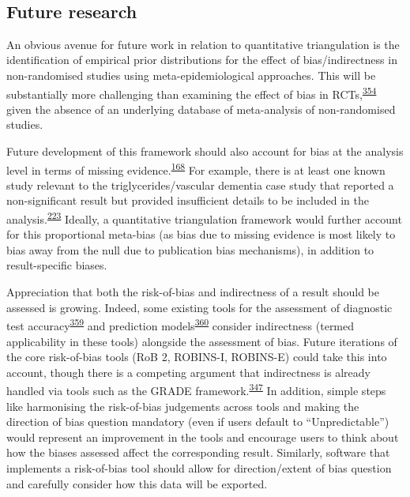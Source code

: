 \documentclass[a4paper, twoside]{templates/ociamthesis}
\begin{document}
~

\hypertarget{future-research}{%
\subsection{Future research}\label{future-research}}

An obvious avenue for future work in relation to quantitative triangulation is the identification of empirical prior distributions for the effect of bias/indirectness in non-randomised studies using meta-epidemiological approaches. This will be substantially more challenging than examining the effect of bias in RCTs,\textsuperscript{\protect\hyperlink{ref-savovic2018}{354}} given the absence of an underlying database of meta-analysis of non-randomised studies.

Future development of this framework should also account for bias at the analysis level in terms of missing evidence.\textsuperscript{\protect\hyperlink{ref-zotero-15123}{168}} For example, there is at least one known study relevant to the triglycerides/vascular dementia case study that reported a non-significant result but provided insufficient details to be included in the analysis.\textsuperscript{\protect\hyperlink{ref-chiang2007}{223}} Ideally, a quantitative triangulation framework would further account for this proportional meta-bias (as bias due to missing evidence is most likely to bias away from the null due to publication bias mechanisms), in addition to result-specific biases.

Appreciation that both the risk-of-bias and indirectness of a result should be assessed is growing. Indeed, some existing tools for the assessment of diagnostic test accuracy\textsuperscript{\protect\hyperlink{ref-whiting2011}{359}} and prediction models\textsuperscript{\protect\hyperlink{ref-moons2019}{360}} consider indirectness (termed applicability in these tools) alongside the assessment of bias. Future iterations of the core risk-of-bias tools (RoB 2, ROBINS-I, ROBINS-E) could take this into account, though there is a competing argument that indirectness is already handled via tools such as the GRADE framework.\textsuperscript{\protect\hyperlink{ref-guyatt2011}{347}} In addition, simple steps like harmonising the risk-of-bias judgements across tools and making the direction of bias question mandatory (even if users default to ``Unpredictable'') would represent an improvement in the tools and encourage users to think about how the biases assessed affect the corresponding result. Similarly, software that implements a risk-of-bias tool should allow for direction/extent of bias question and carefully consider how this data will be exported.
\end{document}
